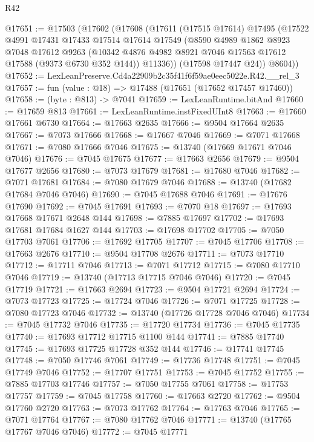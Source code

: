 \begin{lexlean}{R42}
\begin{coremodule}
{@17651 := @17503
    (@17602
      (@17608
        (@17611
          (@17515 @17614)
          @17495
          (@17522
            @4991
            @17431
            @17433
            @17514
            @17614
            @17549
            (@8590
              @4989
              @1862
              @8923
              @7048
              @17612
              @9263
              (@10342 @4876 @4982 @8921 @7046 @17563 @17612 @17588 (@9373 @6730 @352 @144))
              @11336))
          (@17598 @17447 @24))
        @8604))
@17652 := LexLeanPreserve.Cd4a22909b2c35f41f6f59ae0eec5022e.R42.__rel_3
@17657 := fun (value : @18) => @17488 (@17651 (@17652 @17457 @17460))
@17658 := (byte : @813) -> @7041
@17659 := LexLeanRuntime.bitAnd
@17660 := @17659 @813
@17661 := LexLeanRuntime.instFixedUInt8
@17663 := @17660 @17661 @6730
@17664 := @17663 @2635
@17666 := @9504 @17664 @2635
@17667 := @7073 @17666
@17668 := @17667 @7046
@17669 := @7071 @17668
@17671 := @7080 @17666 @7046
@17675 := @13740 (@17669 @17671 @7046 @7046)
@17676 := @7045 @17675
@17677 := @17663 @2656
@17679 := @9504 @17677 @2656
@17680 := @7073 @17679
@17681 := @17680 @7046
@17682 := @7071 @17681
@17684 := @7080 @17679 @7046
@17688 := @13740 (@17682 @17684 @7046 @7046)
@17690 := @7045 @17688 @7046
@17691 := @17676 @17690
@17692 := @7045 @17691
@17693 := @7070 @18
@17697 := @17693 @17668 @17671 @2648 @144
@17698 := @7885 @17697
@17702 := @17693 @17681 @17684 @1627 @144
@17703 := @17698 @17702
@17705 := @7050 @17703 @7061
@17706 := @17692 @17705
@17707 := @7045 @17706
@17708 := @17663 @2676
@17710 := @9504 @17708 @2676
@17711 := @7073 @17710
@17712 := @17711 @7046
@17713 := @7071 @17712
@17715 := @7080 @17710 @7046
@17719 := @13740 (@17713 @17715 @7046 @7046)
@17720 := @7045 @17719
@17721 := @17663 @2694
@17723 := @9504 @17721 @2694
@17724 := @7073 @17723
@17725 := @17724 @7046
@17726 := @7071 @17725
@17728 := @7080 @17723 @7046
@17732 := @13740 (@17726 @17728 @7046 @7046)
@17734 := @7045 @17732 @7046
@17735 := @17720 @17734
@17736 := @7045 @17735
@17740 := @17693 @17712 @17715 @1100 @144
@17741 := @7885 @17740
@17745 := @17693 @17725 @17728 @352 @144
@17746 := @17741 @17745
@17748 := @7050 @17746 @7061
@17749 := @17736 @17748
@17751 := @7045 @17749 @7046
@17752 := @17707 @17751
@17753 := @7045 @17752
@17755 := @7885 @17703 @17746
@17757 := @7050 @17755 @7061
@17758 := @17753 @17757
@17759 := @7045 @17758
@17760 := @17663 @2720
@17762 := @9504 @17760 @2720
@17763 := @7073 @17762
@17764 := @17763 @7046
@17765 := @7071 @17764
@17767 := @7080 @17762 @7046
@17771 := @13740 (@17765 @17767 @7046 @7046)
@17772 := @7045 @17771
}
\end{coremodule}
\end{lexlean}
